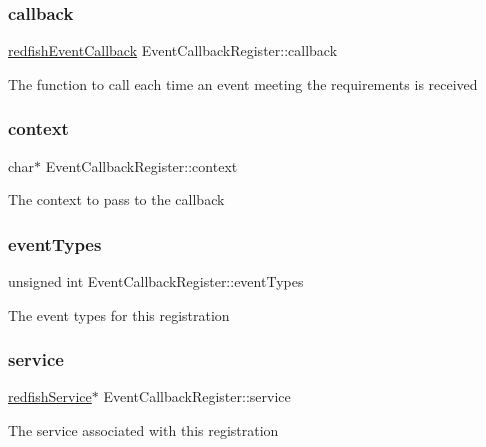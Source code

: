 \subsubsection{\texorpdfstring{callback}{callback}}
{\footnotesize\ttfamily \hyperlink{redfishService_8h_a758b03d26a0d4f87974b4e16fbd833e8}{redfish\+Event\+Callback} Event\+Callback\+Register\+::callback}

The function to call each time an event meeting the requirements is received \mbox{\label{structEventCallbackRegister_a7e1b05f5578cba8db9ba6335bc9794e6}} 
\subsubsection{\texorpdfstring{context}{context}}
{\footnotesize\ttfamily char$\ast$ Event\+Callback\+Register\+::context}

The context to pass to the callback \mbox{\label{structEventCallbackRegister_aae27b426e376de0eba9b424dede08e60}} 
\subsubsection{\texorpdfstring{event\+Types}{eventTypes}}
{\footnotesize\ttfamily unsigned int Event\+Callback\+Register\+::event\+Types}

The event types for this registration \mbox{\label{structEventCallbackRegister_aa6b4bd76f3f3b6370867148e0ba47ec2}} 
\subsubsection{\texorpdfstring{service}{service}}
{\footnotesize\ttfamily \hyperlink{redfishService_8h_a4c9115c0f0a21de971c0dfae06f26372}{redfish\+Service}$\ast$ Event\+Callback\+Register\+::service}

The service associated with this registration \mbox{\label{structEventCallbackRegister_a0daf5de835ad6515d1fb180f1bbaa91e}} 
